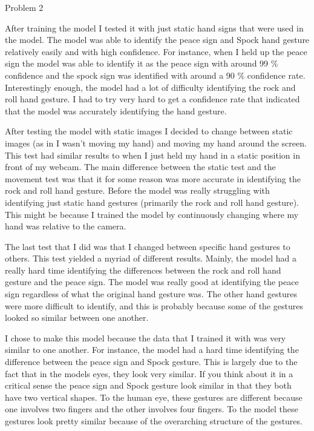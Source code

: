 \begin{problem}{Problem 2}
\begin{Highlight}[Solution]
\begin{spacing}{1.50}
            After training the model I tested it with just static hand signs that were used in the model. The model was able to identify the peace sign and Spock hand gesture relatively easily and with
            high confidence. For instance, when I held up the peace sign the model was able to identify it as the peace sign with around 99 \% confidence and the spock sign was identified with around a
            90 \% confidence rate. Interestingly enough, the model had a lot of difficulty identifying the rock and roll hand gesture. I had to try very hard to get a confidence rate that indicated that
            the model was accurately identifying the hand gesture.

            After testing the model with static images I decided to change between static images (as in I wasn't moving my hand) and moving my hand around the screen. This test had similar results to when
            I just held my hand in a static position in front of my webcam. The main difference between the static test and the movement test was that it for some reason was more accurate in identifying
            the rock and roll hand gesture. Before the model was really struggling with identifying just static hand gestures (primarily the rock and roll hand gesture). This might be because I trained the
            model by continuously changing where my hand was relative to the camera.

            The last test that I did was that I changed between specific hand gestures to others. This test yielded a myriad of different results. Mainly, the model had a really hard time identifying the
            differences between the rock and roll hand gesture and the peace sign. The model was really good at identifying the peace sign regardless of what the original hand gesture was. The other hand
            gestures were more difficult to identify, and this is probably because some of the gestures looked so similar between one another.

            I chose to make this model because the data that I trained it with was very similar to one another. For instance, the model had a hard time identifying the difference between the peace sign
            and Spock gesture. This is largely due to the fact that in the models eyes, they look very similar. If you think about it in a critical sense the peace sign and Spock gesture look similar in 
            that they both have two vertical shapes. To the human eye, these gestures are different because one involves two fingers and the other involves four fingers. To the model these gestures look
            pretty similar because of the overarching structure of the gestures.


\end{spacing}
\end{Highlight}
\end{problem}
